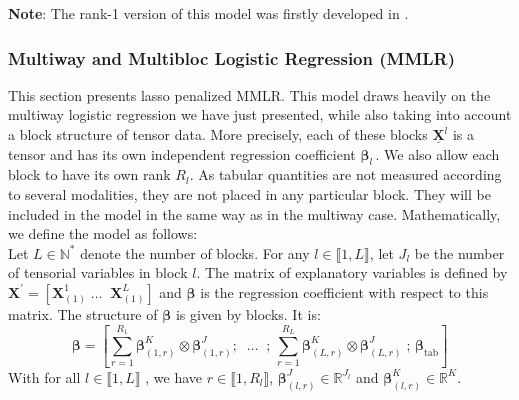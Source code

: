\documentclass[preprint,12pt]{elsarticle}
\begin{document}
\noindent \textbf{Note}: The rank-1 version of this model was firstly developed in \cite{multi_rank_1}.

\subsubsection{Multiway and Multibloc Logistic Regression (MMLR)}

\noindent This section presents lasso penalized MMLR. This model draws heavily on the multiway logistic regression we have just presented, while also taking into account a block structure of tensor data. More precisely, each of these blocks $\underline{\mathbf{X}}^{l}$  is a tensor and has its own independent regression coefficient $\bm{\beta}_l \,$. We also allow each block to have its own rank $R_l$. As tabular quantities are not measured according to several modalities, they are not placed in any particular block. They will be included in the model in the same way as in the multiway case. Mathematically, we define the model as follows:\\
\indent Let $L \in \mathbb{N}^{*}$ denote the number of blocks. For any $l \in \llbracket 1, L \rrbracket$, let $J_l$ be the number of tensorial variables in block $l$. The matrix of explanatory variables is defined by $\mathbf{X}^{'} = [\mathbf{X}^1_{(1)} \; \hdots \; \; \mathbf{X}^L_{(1)}] $ and $\bm{\beta}$ is the regression coefficient with respect to this matrix. The structure of $\bm{\beta}$ is given by blocks. It is:
\begin{equation}
    \bm{\beta} = \left[ \sum\limits_{r = 1}^{R_1} \bm{\beta}_{(1,r)}^K \otimes \bm{\beta}_{(1,r)}^J;   \; \; \hdots  \; \; ;\, \sum\limits_{r = 1}^{R_L}\bm{\beta}_{(L,r)}^K \otimes \bm{\beta}_{(L,r)}^J\; ;\,\bm{\beta}_{\text{tab}}   \right]
\end{equation}
With for all $l \in \llbracket 1,L \rrbracket$ , we have $r \in \llbracket 1, R_l\rrbracket$,  $\bm{\beta}_{(l,r)}^J \in \mathbb{R}^{J_l}$ and $\bm{\beta}_{(l,r)}^K \in \mathbb{R}^{K}$. \\
\end{document}
